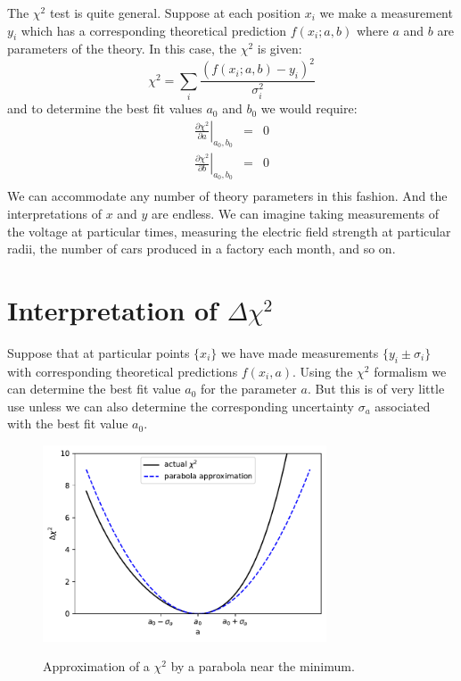 \documentclass[12pt,oneside]{book}
\begin{document}
The $\chi^2$ test is quite general.  Suppose at each position
$x_i$ we make a measurement $y_i$ which has a corresponding
theoretical prediction $f(x_i; a, b)$ where $a$ and $b$ are parameters
of the theory.  In this case, the $\chi^2$ is given:
\begin{displaymath}
\chi^2 = \sum_i \frac{(f(x_i;a,b) - y_i)^2}{\sigma_i^2}
\end{displaymath}
and to determine the best fit values $a_0$ and $b_0$ we would require:
\begin{eqnarray*}
  \left.\frac{\partial\chi^2}{\partial a}\right|_{a_0,b_0} &=& 0 \\
  \left.\frac{\partial\chi^2}{\partial b}\right|_{a_0,b_0} &=& 0 \\
\end{eqnarray*}
We can accommodate any number of theory parameters in this fashion.
And the interpretations of $x$ and $y$ are endless.  We can imagine
taking measurements of the voltage at particular times, measuring the
electric field strength at particular radii, the number of cars
produced in a factory each month, and so on.

\section{Interpretation of $\Delta \chi^2$}

Suppose that at particular points $\{x_i\}$ we have made measurements
$\{y_i \pm \sigma_i\}$ with corresponding theoretical predictions
$f(x_i, a)$.  Using the $\chi^2$ formalism we can determine the best
fit value $a_0$ for the parameter $a$.  But this is of very little use
unless we can also determine the corresponding uncertainty $\sigma_a$
associated with the best fit value $a_0$.

\begin{figure}[htbp]
\begin{center}
{\includegraphics[width=0.75\textwidth]{figs/delchisq.pdf}}
\end{center}
\caption{\label{fig:delchisq} Approximation of a $\chi^2$ by a parabola near the minimum.}
\end{figure}
\end{document}
